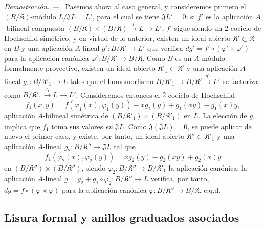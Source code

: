 \documentclass[10pt,oneside]{book}
\newenvironment{proof}{%
  \par\medskip\noindent\textit{Demostración. ---\ }}{\par}
\providecommand{\setmin}{-}%
\begin{document}
\begin{proof}
Pasemos ahora al caso general, y consideremos primero el
$(B/\mathfrak K)$-módulo $L/\mathfrak JL=L'$, para el cual se tiene
$\mathfrak JL'=0$; si $f'$ es la aplicación $A$-bilineal compuesta
$(B/\mathfrak K)\times(B/\mathfrak K)\xrightarrow{f}L\to L'$, $f'$ sigue
siendo un $2$-cociclo de Hochschild simétrico, y en virtud de lo anterior,
existen un ideal abierto $\mathfrak K'\subset\mathfrak K$ en $B$ y
una aplicación $A$-lineal $g':B/\mathfrak K'\to L'$ que verifica
$dg'=f'\circ(\varphi'\times\varphi')$ para la aplicación canónica
$\varphi':B/\mathfrak K'\to B/\mathfrak K$. Como $B$ es un
$A$-módulo formalmente proyectivo, existen un ideal abierto
$\mathfrak K'_1\subset\mathfrak K'$ y una aplicación $A$-lineal
$g_1:B/\mathfrak K'_1\to L$ tales que el homomorfismo
$B/\mathfrak K'_1\to B/\mathfrak K'\xrightarrow{g'}L'$ se factoriza como
$B/\mathfrak K'_1\xrightarrow{g_1}L\to L'$. Consideremos entonces el
$2$-cociclo de Hochschild
\[
  f_1(x,y)=f(\varphi_1(x),\varphi_1(y))\setmin xg_1(y)+g_1(xy)\setmin g_1(x)y,
\]
aplicación $A$-bilineal simétrica de
$(B/\mathfrak K'_1)\times(B/\mathfrak K'_1)$ en $L$. La elección de
$g_1$ implica que $f_1$ toma sus valores \emph{en} $\mathfrak JL$. Como
$\mathfrak J(\mathfrak JL)=0$, se puede aplicar de nuevo el primer caso,
y existe, por tanto, un ideal abierto
$\mathfrak K''\subset\mathfrak K'_1$ y una aplicación $A$-lineal
$g_2:B/\mathfrak K''\to\mathfrak JL$ tal que
\[
  f_1(\varphi_2(x),\varphi_2(y))=xg_2(y)\setmin g_2(xy)+g_2(x)y
\]
en $(B/\mathfrak K'')\times(B/\mathfrak K'')$,
siendo $\varphi_2:B/\mathfrak K''\to B/\mathfrak K'_1$ la aplicación
canónica; la aplicación $A$-lineal
$g=g_2+g_1\circ\varphi_2:B/\mathfrak K''\to L$ verifica, por tanto,
$dg=f\circ(\varphi\times\varphi)$ para la aplicación canónica
$\varphi:B/\mathfrak K''\to B/\mathfrak K$. c.q.d.
\end{proof}

\subsection{Lisura formal y anillos graduados asociados}
\label{subsection:0.19.5-es}
\end{document}
